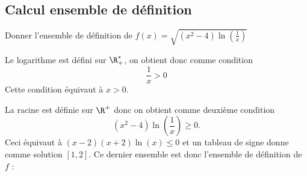 \subsection{Calcul ensemble de définition}
\begin{exercice}
Donner l'ensemble de définition de $f(x) = \sqrt{ (x^2-4)\ln\left(\frac{1}{x}\right)}$
\end{exercice}


\begin{correction}


Le logarithme est défini sur $\R^*_+$, on obtient donc comme condition 
$$\frac{1}{x}>0$$
Cette  condition équivaut à $x>0$.

La racine est définie sur $\R^+$ donc on obtient comme deuxième condition 
$$(x^2-4)\ln(\frac{1}{x}) \geq 0.$$
Ceci équivaut à $(x-2)(x+2) \ln(x)\leq 0$ et un tableau de signe donne comme solution $[1,2]$.
Ce dernier ensemble est donc l'ensemble de définition de $f$ :

\begin{center}
\end{center}
\end{correction}